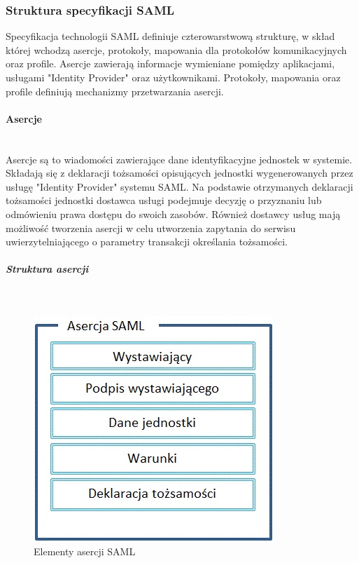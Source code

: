 	\subsubsection{Struktura specyfikacji SAML}

		Specyfikacja technologii SAML definiuje czterowarstwową strukturę, w skład której wchodzą asercje, protokoły, mapowania dla protokołów komunikacyjnych oraz profile. 
		Asercje zawierają informacje wymieniane pomiędzy aplikacjami, usługami "Identity Provider" oraz użytkownikami. Protokoły, mapowania oraz profile definiują mechanizmy przetwarzania asercji.

		\paragraph{Asercje}\mbox{}\\
					
			Asercje są to wiadomości zawierające dane identyfikacyjne jednostek w systemie. Składają się z deklaracji tożsamości opisujących jednostki wygenerowanych przez usługę "Identity Provider" systemu SAML. Na podstawie otrzymanych deklaracji tożsamości jednostki dostawca usługi podejmuje decyzję o przyznaniu lub odmówieniu prawa dostępu do swoich zasobów. Również dostawcy usług mają możliwość tworzenia asercji w celu utworzenia zapytania do serwisu uwierzytelniającego o parametry transakcji określania tożsamości. 

			\subparagraph{Struktura asercji}\mbox{}\\
			
				\begin{figure}[h]
				\centering
					\includegraphics{img/samlAssertion.jpg}
				\caption{Elementy asercji SAML}
				\label{Elementy asercji SAML}
				\end{figure}

